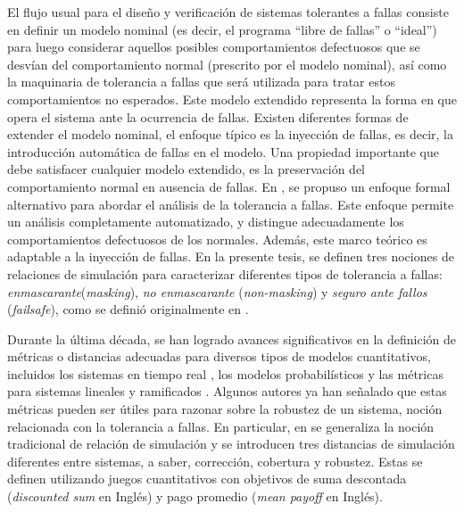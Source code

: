 El flujo usual para el diseño y verificación de sistemas tolerantes a fallas consiste en definir un modelo nominal (es decir, el programa “libre de fallas” o “ideal”) para luego considerar aquellos posibles comportamientos defectuosos que se desvían del comportamiento normal (prescrito por el modelo nominal), así como la maquinaria de tolerancia a fallas que será utilizada para tratar estos comportamientos no esperados. Este modelo extendido representa la forma en que opera el sistema ante la ocurrencia de fallas. Existen diferentes formas de extender el modelo nominal, el enfoque típico es la inyección de fallas, es decir, la introducción automática de fallas en el modelo. Una propiedad importante que debe satisfacer cualquier modelo extendido, es la preservación del comportamiento normal en ausencia de fallas. En \cite{Gartner99}, se propuso un enfoque formal alternativo para abordar el análisis de la tolerancia a fallas. Este enfoque permite un análisis completamente automatizado, y distingue adecuadamente los comportamientos defectuosos de los normales. Además, este marco teórico es adaptable a la inyección de fallas. En la presente tesis, se definen tres nociones de relaciones de simulación para caracterizar diferentes tipos de tolerancia a fallas: \emph{enmascarante}(\textit{masking}), \emph{no enmascarante} (\textit{non-masking}) y \emph{seguro ante fallos} (\textit{failsafe}), como se definió originalmente en \cite{Gartner99}.

Durante la última década, se han logrado avances significativos en la definición de métricas o distancias adecuadas para diversos tipos de modelos cuantitativos, incluidos los sistemas en tiempo real \cite{HenzingerMP05}, los modelos probabilísticos \cite{DesharnaisGJP04} y las métricas para sistemas lineales y ramificados \cite{AlfaroFS09, Henzinger13, LarsenFT11, ThraneFL10}. Algunos autores ya han señalado que estas métricas pueden ser útiles para razonar sobre la robustez de un sistema, noción relacionada con la tolerancia a fallas. En particular, en \cite{CernyHR12} se generaliza la noción tradicional de relación de simulación y se introducen tres distancias de simulación diferentes entre sistemas, a saber, corrección, cobertura y robustez. Estas se definen utilizando juegos cuantitativos con objetivos de suma descontada (\textit{discounted sum} en Inglés) y  pago promedio (\textit{mean payoff} en Inglés).


